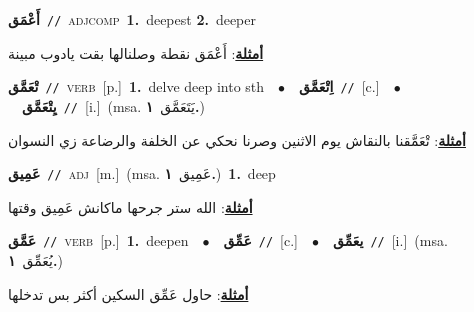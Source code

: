 \documentclass[10pt,a4paper,twoside]{article} %
\begin{document}
\begin{multicols}{2}
{\setlength\topsep{0pt}\textbf{\foreignlanguage{arabic}{أَعْمَق}}\ {\color{gray}\texttt{//}\color{black}}\ \textsc{adj\textunderscore comp}\ \textbf{1.}~deepest  \textbf{2.}~deeper\  \begin{flushright}\color{gray}\foreignlanguage{arabic}{\textbf{\underline{\foreignlanguage{arabic}{أمثلة}}}: أَعْمَق نقطة وصلنالها بقت يادوب مبينة}\end{flushright}\color{black}} \vspace{2mm}

{\setlength\topsep{0pt}\textbf{\foreignlanguage{arabic}{تْعَمَّق}}\ {\color{gray}\texttt{//}\color{black}}\ \textsc{verb}\ [p.]\ \textbf{1.}~delve deep into sth\ \ $\bullet$\ \ \setlength\topsep{0pt}\textbf{\foreignlanguage{arabic}{اِتْعَمَّق}}\ {\color{gray}\texttt{//}\color{black}}\ [c.]\ \ $\bullet$\ \ \setlength\topsep{0pt}\textbf{\foreignlanguage{arabic}{يِتْعَمَّق}}\ {\color{gray}\texttt{//}\color{black}}\ [i.]\ \color{gray}(msa. \foreignlanguage{arabic}{يَتَعَمَّق}~\foreignlanguage{arabic}{\textbf{١.}})\color{black}\  \begin{flushright}\color{gray}\foreignlanguage{arabic}{\textbf{\underline{\foreignlanguage{arabic}{أمثلة}}}: تْعَمَّقنا بالنقاش يوم الاثنين وصرنا نحكي عن الخلفة والرضاعة زي النسوان}\end{flushright}\color{black}} \vspace{2mm}

{\setlength\topsep{0pt}\textbf{\foreignlanguage{arabic}{عَمِيق}}\ {\color{gray}\texttt{//}\color{black}}\ \textsc{adj}\ [m.]\ \color{gray}(msa. \foreignlanguage{arabic}{عَمِيق}~\foreignlanguage{arabic}{\textbf{١.}})\color{black}\ \textbf{1.}~deep\  \begin{flushright}\color{gray}\foreignlanguage{arabic}{\textbf{\underline{\foreignlanguage{arabic}{أمثلة}}}: الله ستر جرحها ماكانش عَمِيق وقتها}\end{flushright}\color{black}} \vspace{2mm}

{\setlength\topsep{0pt}\textbf{\foreignlanguage{arabic}{عَمَّق}}\ {\color{gray}\texttt{//}\color{black}}\ \textsc{verb}\ [p.]\ \textbf{1.}~deepen\ \ $\bullet$\ \ \setlength\topsep{0pt}\textbf{\foreignlanguage{arabic}{عَمِّق}}\ {\color{gray}\texttt{//}\color{black}}\ [c.]\ \ $\bullet$\ \ \setlength\topsep{0pt}\textbf{\foreignlanguage{arabic}{يعَمِّق}}\ {\color{gray}\texttt{//}\color{black}}\ [i.]\ \color{gray}(msa. \foreignlanguage{arabic}{يُعَمِّق}~\foreignlanguage{arabic}{\textbf{١.}})\color{black}\  \begin{flushright}\color{gray}\foreignlanguage{arabic}{\textbf{\underline{\foreignlanguage{arabic}{أمثلة}}}: حاول عَمِّق السكين أكثر بس تدخلها}\end{flushright}\color{black}} \vspace{2mm}


\end{multicols}
\end{document}
